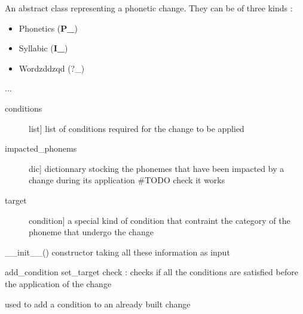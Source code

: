 \documentclass[letterpaper,10pt,english]{sphinxmanual}
\begin{document}
\begin{fulllineitems}
\label{\detokenize{index:Change.Change}}
\sphinxAtStartPar
An abstract class representing a phonetic change.
They can be of three kinds :
\begin{itemize}
\item {} 
\sphinxAtStartPar
Phonetics ({\color{red}\bfseries{}P\_})

\item {} 
\sphinxAtStartPar
Syllabic ({\color{red}\bfseries{}I\_})

\item {} 
\sphinxAtStartPar
Wordzddzqd (?\_)

\end{itemize}

\sphinxAtStartPar
...
\begin{description}
\item[{conditions}] \leavevmode{[}list{]}
\sphinxAtStartPar
list of conditions required for the change to be applied

\item[{impacted\_phonems}] \leavevmode{[}dic{]}
\sphinxAtStartPar
dictionnary stocking the phonemes that have been impacted by a change during its application
\#TODO check it works

\item[{target}] \leavevmode{[}condition{]}
\sphinxAtStartPar
a special kind of condition that contraint the category of the phoneme that undergo the change

\end{description}

\sphinxAtStartPar
\_\_init\_\_() constructor taking all these information as input

\sphinxAtStartPar
add\_condition
set\_target
check : checks if all the conditions are satisfied before the application of the change

\begin{fulllineitems}
\label{\detokenize{index:Change.Change.add_condition}}
\sphinxAtStartPar
used to add a condition to an already built change


\end{fulllineitems}
\end{fulllineitems}
\end{document}
